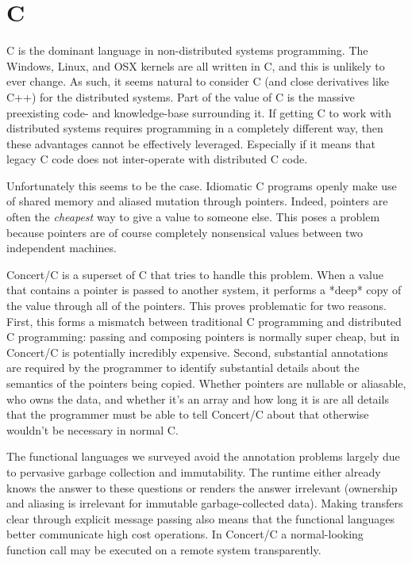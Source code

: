 \documentclass[10pt,a4paper,twocolumn]{article}
\begin{document}
\section{C}

C is the dominant language in non-distributed systems programming. The Windows,
Linux, and OSX kernels are all written in C, and this is unlikely to ever
change. As such, it seems natural to consider C (and close derivatives like C++)
for the distributed systems. Part of the value of C is the massive preexisting
code- and knowledge-base surrounding it. If getting C to work with distributed
systems requires programming in a completely different way, then these
advantages cannot be effectively leveraged. Especially if it means that legacy C
code does not inter-operate with distributed C code.

Unfortunately this seems to be the case. Idiomatic C programs openly make use of
shared memory and aliased mutation through pointers. Indeed, pointers are often
the \emph{cheapest} way to give a value to someone else. This poses a problem
because pointers are of course completely nonsensical values between two independent
machines.

Concert/C \cite{auerbach1994concert} is a superset of C that tries to handle
this problem. When a value that contains a pointer is passed to another system,
it performs a *deep* copy of the value through all of the pointers. This proves
problematic for two reasons. First, this forms a mismatch between traditional C
programming and distributed C programming: passing and composing pointers is
normally super cheap, but in Concert/C is potentially incredibly expensive.
Second, substantial annotations are required by the programmer to identify
substantial details about the semantics of the pointers being copied. Whether
pointers are nullable or aliasable, who owns the data, and whether it's an array
and how long it is are all details that the programmer must be able to tell
Concert/C about that otherwise wouldn't be necessary in normal C.

The functional languages we surveyed avoid the annotation problems largely due
to pervasive garbage collection and immutability. The runtime either already
knows the answer to these questions or renders the answer irrelevant (ownership
and aliasing is irrelevant for immutable garbage-collected data). Making
transfers clear through explicit message passing also means that the functional
languages better communicate high cost operations. In Concert/C a normal-looking
function call may be executed on a remote system transparently.
\end{document}
